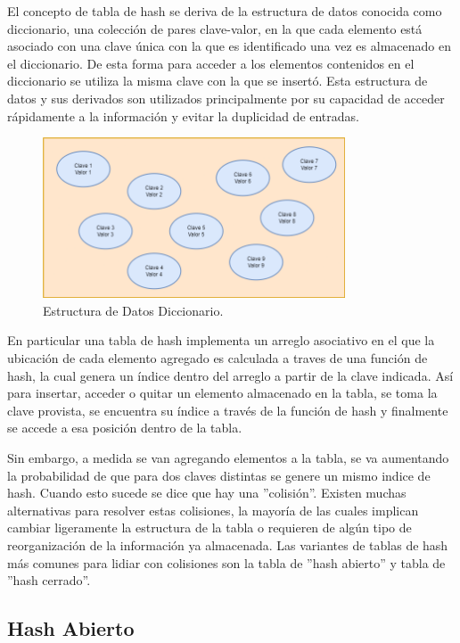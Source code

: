 \documentclass[titlepage,a4paper]{article}
\begin{document}
El concepto de tabla de hash se deriva de la estructura de datos conocida como
diccionario, una colección de pares clave-valor, en la que cada elemento está
asociado con una clave única con la que es identificado una vez es almacenado en
el diccionario. De esta forma para acceder a los elementos contenidos en el
diccionario se utiliza la misma clave con la que se insertó. Esta estructura de
datos y sus derivados son utilizados principalmente por su capacidad de acceder
rápidamente a la información y evitar la duplicidad de entradas.

\begin{figure}[H]
\centering
\includegraphics[width=0.8\textwidth]{img/1_diccionario.png}
\caption{\label{fig:seq01}Estructura de Datos Diccionario.}
\end{figure}

En particular una tabla de hash implementa un arreglo asociativo en el que la
ubicación de cada elemento agregado es calculada a traves de una función de
hash, la cual genera un índice dentro del arreglo a partir de la clave
indicada.  Así para insertar, acceder o quitar un elemento almacenado en la
tabla, se toma la clave provista, se encuentra su índice a través de la función
de hash y finalmente se accede a esa posición dentro de la tabla. 

Sin embargo, a medida se van agregando elementos a la tabla, se va aumentando
la probabilidad de que para dos claves distintas se genere un mismo indice de
hash. Cuando esto sucede se dice que hay una ''colisión''. Existen muchas
alternativas para resolver estas colisiones, la mayoría de las cuales implican
cambiar ligeramente la estructura de la tabla o requieren de algún tipo de
reorganización de la información ya almacenada. Las variantes de tablas de hash
más comunes para lidiar con colisiones son la tabla de ''hash abierto'' y tabla
de ''hash cerrado''. 

													 \subsection{Hash Abierto}
\end{document}
